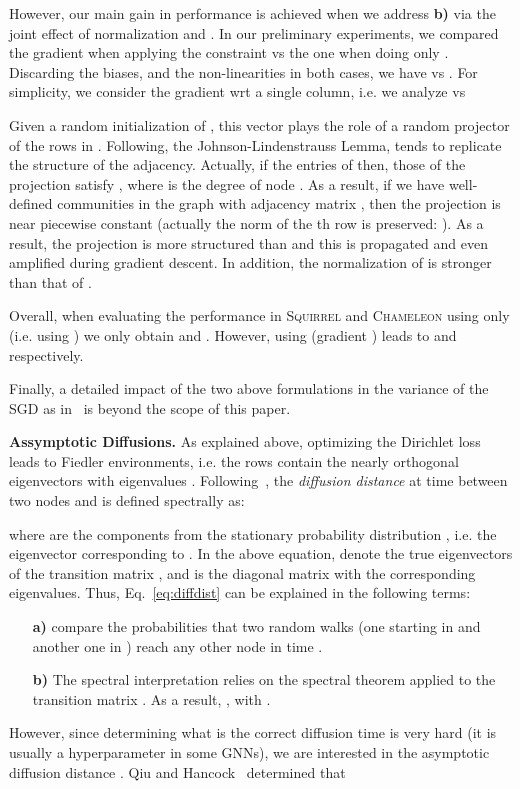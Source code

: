 \documentclass{article}
\theoremstyle{plain}
\theoremstyle{definition}
\begin{document}
However, our main gain in performance is achieved when we address \textbf{b)} via the joint effect of normalization and . In our preliminary experiments, we compared the gradient when applying the constraint  vs the one when doing only . Discarding the biases, and the non-linearities in both cases, we have  vs . For simplicity, we consider the gradient wrt a single column, i.e. we analyze  vs 

Given a random initialization of , this vector plays the role of a random projector of the rows in . Following, the Johnson-Lindenstrauss Lemma,   tends to replicate the structure of the adjacency. Actually, if the entries of  then, those of the projection satisfy , where  is the degree of node . As a result, if we have  well-defined communities in the graph  with adjacency matrix , then the projection  is near piecewise constant (actually the norm of the th row is preserved:  ). As a result, the projection  is more structured than   and this is propagated and even amplified during gradient descent. In addition, the normalization of  is stronger than that of . 

Overall, when evaluating the performance in \textsc{Squirrel} and \textsc{Chameleon} using only  (i.e. using ) we only obtain  and . However, using  (gradient 
) leads to  and  respectively. 

Finally, a detailed impact of the two above formulations in the variance of the SGD as in~\citep{SGD19} is beyond the scope of this paper.  

\textbf{Assymptotic Diffusions.}  As explained above, optimizing the Dirichlet loss leads to Fiedler environments, i.e. the rows  contain the  nearly orthogonal eigenvectors with eigenvalues . Following~\citep{difmaps05}, the \emph{diffusion distance}  at time  between two nodes  and  is defined spectrally as: 


where  are the components from the stationary probability distribution , i.e. the eigenvector  corresponding to . In the above equation,  denote the true eigenvectors of the transition matrix , and  is the diagonal matrix with the corresponding eigenvalues. Thus, Eq.~\ref{eq:diffdist} can be explained in the following terms: 
\begin{itemize}
    \item [\textbf{a)}]  compare the probabilities that two random walks (one starting in  and another one in ) reach any other node  in time .
    \item [\textbf{b)}] The spectral interpretation relies on the spectral theorem applied to the transition matrix . As a result, , with . 
\end{itemize}
However, since determining what is the correct diffusion time is very hard (it is usually a hyperparameter in some GNNs), we are interested in the asymptotic diffusion distance . Qiu and Hancock~\citep{Qiu07CTembedding} determined that 
\end{document}
